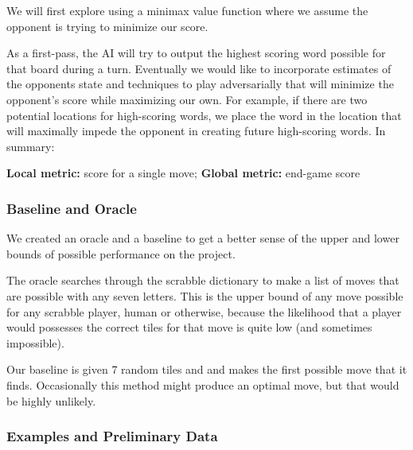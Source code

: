 \documentclass[12pt]{article}
\begin{document}
We will first explore using a minimax value function where we assume
the opponent is trying to minimize our score.

As a first-pass, the AI will try to output the highest scoring word
possible for that board during a turn.  Eventually we would like to
incorporate estimates of the opponents state and techniques to play
adversarially that will minimize the opponent's score while maximizing
our own. For example, if there are two potential locations for
high-scoring words, we place the word in the location that will
maximally impede the opponent in creating future high-scoring
words. In summary:

\textbf{Local metric:} score for a single move; \textbf{Global metric:} end-game score

\subsubsection*{Baseline and Oracle}

We created an oracle and a baseline to get a better sense of the upper
and lower bounds of possible performance on the project.

The oracle searches through the scrabble dictionary to make a list of
moves that are possible with any seven letters. This is the upper bound of
any move possible for any scrabble player, human or otherwise, because
the likelihood that a player would possesses the correct tiles for that
move is quite low (and sometimes impossible).

Our baseline is given 7 random tiles and and makes the
first possible move that it finds. Occasionally this method might
produce an optimal move, but that would be highly unlikely.

\subsubsection*{Examples and Preliminary Data}
\end{document}
